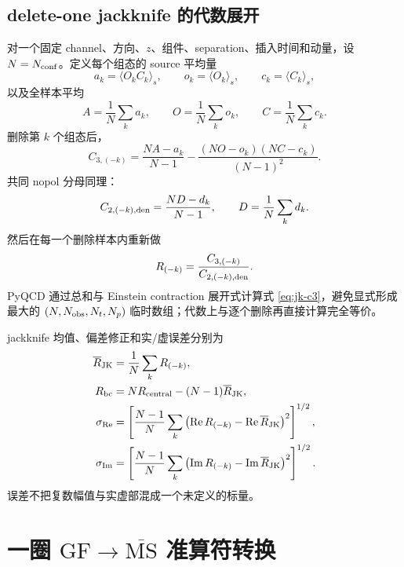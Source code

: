 \documentclass[UTF8,a4paper,11pt]{ctexart}
\newcommand{\MSbar}{\overline{\mathrm{MS}}}
\newcommand{\GF}{\mathrm{GF}}
\begin{document}
\subsection{delete-one jackknife 的代数展开}

对一个固定 channel、方向、$z$、组件、separation、插入时间和动量，设
$N=N_{\rm conf}$。定义每个组态的 source 平均量
\begin{equation}
 a_k=\langle O_kC_k\rangle_s,\qquad
 o_k=\langle O_k\rangle_s,\qquad
 c_k=\langle C_k\rangle_s,
\end{equation}
以及全样本平均
\begin{equation}
 A=\frac1N\sum_k a_k,\qquad
 O=\frac1N\sum_k o_k,\qquad
 C=\frac1N\sum_k c_k.
\end{equation}
删除第 $k$ 个组态后，
\begin{equation}
 C_{3,(-k)}
 =\frac{NA-a_k}{N-1}
 -\frac{(NO-o_k)(NC-c_k)}{(N-1)^2}.
\label{eq:jk-c3}
\end{equation}
共同 nopol 分母同理：
\begin{equation}
 C_{2,(-k),\rm den}
 =\frac{ND-d_k}{N-1},
\qquad D=\frac1N\sum_k d_k.
\label{eq:jk-c2}
\end{equation}
然后在每一个删除样本内重新做
\begin{equation}
 R_{(-k)}=\frac{C_{3,(-k)}}{C_{2,(-k),\rm den}}.
\label{eq:jk-ratio}
\end{equation}
PyQCD 通过总和与 Einstein contraction 展开式计算式
\eqref{eq:jk-c3}，避免显式形成最大的
$(N,N_{\rm obs},N_t,N_p)$ 临时数组；代数上与逐个删除再直接计算完全等价。

jackknife 均值、偏差修正和实/虚误差分别为
\begin{align}
 \overline R_{\rm JK}
 &=\frac1N\sum_k R_{(-k)},\\
 R_{\rm bc}
 &=N R_{\rm central}-(N-1)\overline R_{\rm JK},\\
 \sigma_{\rm Re}
 &=\left[\frac{N-1}{N}\sum_k
   \left(\operatorname{Re}R_{(-k)}
        -\operatorname{Re}\overline R_{\rm JK}\right)^2\right]^{1/2},\\
 \sigma_{\rm Im}
 &=\left[\frac{N-1}{N}\sum_k
   \left(\operatorname{Im}R_{(-k)}
        -\operatorname{Im}\overline R_{\rm JK}\right)^2\right]^{1/2}.
\label{eq:jk-errors}
\end{align}
误差不把复数幅值与实虚部混成一个未定义的标量。

\section{一圈 $\GF\to\MSbar$ 准算符转换}
\end{document}
